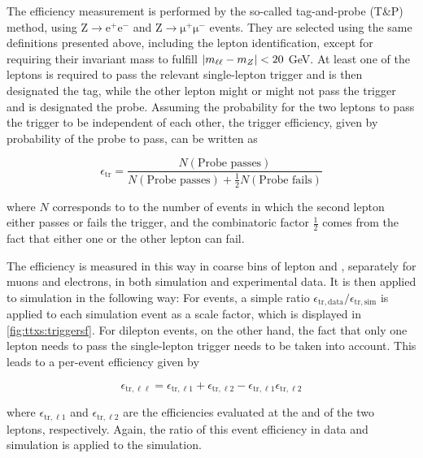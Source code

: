 The efficiency measurement is performed by the so-called tag-and-probe (T\&P) method, using $\mathrm{Z} \rightarrow \mathrm{e^+ e^-}$ and $\mathrm{Z} \rightarrow \mathrm{\mu^+ \mu^-}$ events. They are selected using the same definitions presented above, including the lepton identification, except for requiring their invariant mass to fulfill $| m_{\ell\ell} - m_Z | < 20$ GeV. At least one of the leptons is required to pass the relevant single-lepton trigger and is then designated the tag, while the other lepton might or might not pass the trigger and is designated the probe. Assuming the probability for the two leptons to pass the trigger to be independent of each other, the trigger efficiency, given by probability of the probe to pass, can be written as

\begin{equation}
    \epsilon_{\mathrm{tr}} = \frac{N (\text{Probe passes})}{ N (\text{Probe passes}) + \frac{1}{2} N (\text{Probe fails}) }
\end{equation}

where $N$ corresponds to to the number of events in which the second lepton either passes or fails the trigger, and the combinatoric factor $\frac{1}{2}$ comes from the fact that either one or the other lepton can fail. 

The efficiency is measured in this way in coarse bins of lepton \pt and \abseta, separately for muons and electrons, in both simulation and experimental data. It is then applied to simulation in the following way: For \ljets events, a simple ratio $\epsilon_{\mathrm{tr,data}} / \epsilon_{\mathrm{tr,sim}}$ is applied to each simulation event as a scale factor, which is displayed in \cref{fig:ttxs:triggersf}. For dilepton events, on the other hand, the fact that only one lepton needs to pass the single-lepton trigger needs to be taken into account. This leads to a per-event efficiency given by

\begin{equation}
\label{eq:ttxs:triggersf}
    \epsilon_{\mathrm{tr,\ell \ell}} = \epsilon_{\mathrm{tr,\ell 1}} + \epsilon_{\mathrm{tr,\ell 2}} - \epsilon_{\mathrm{tr,\ell 1}} \epsilon_{\mathrm{tr,\ell 2}}
\end{equation}

where $\epsilon_{\mathrm{tr,\ell 1}}$ and $\epsilon_{\mathrm{tr,\ell 2}}$ are the efficiencies evaluated at the \pt and \abseta of the two leptons, respectively. Again, the ratio of this event efficiency in data and simulation is applied to the simulation.

